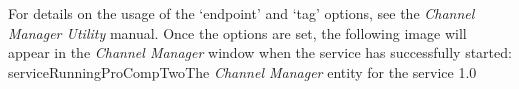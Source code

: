 For details on the usage of the `endpoint' and `tag' options, see the \emph{Channel
Manager Utility} manual.
Once the options are set, the following image will appear in the \emph{Channel Manager}
window when the service has successfully started:
%
{serviceRunningProCompTwo}{The \emph{Channel Manager} entity for the \PCtwoI{} service}%
{1.0}
\secondaryEnd
\primaryEnd{}
